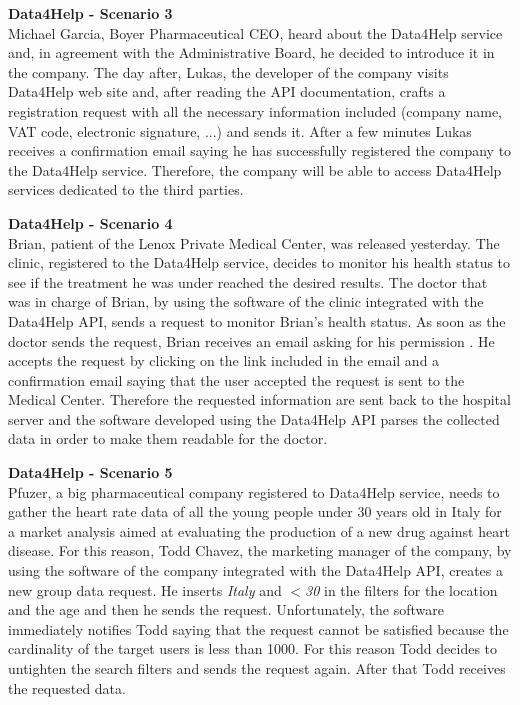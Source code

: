 \textbf{Data4Help - Scenario 3} \\
Michael Garcia, Boyer Pharmaceutical CEO, heard about the Data4Help service and, in agreement with the Administrative Board, he decided to introduce it in the company. The day after, Lukas, the developer of the company visits Data4Help web site and, after reading the API documentation, crafts a registration request with all the necessary information included (company name, VAT code, electronic signature, ...) and sends it. After a few minutes Lukas receives a confirmation email saying he has successfully registered the company to the Data4Help service. Therefore, the company will be able to access Data4Help services dedicated to the third parties.

\textbf{Data4Help - Scenario 4} \\
Brian, patient of the Lenox Private Medical Center, was released  yesterday. The clinic, registered to the Data4Help service, decides to monitor his health status to see if the treatment he was under reached the desired results.
The doctor that was in charge of Brian, by using the software of the clinic integrated with the Data4Help API, sends a request to monitor Brian's health status.
As soon as the doctor sends the request, Brian receives an email asking for his permission . He accepts the request by clicking on the link included in the email and a confirmation email saying that the user accepted the request is sent to the Medical Center. Therefore the requested information are sent back to the hospital server and the software developed using the Data4Help API parses the collected data in order to make them readable for the doctor.

\textbf{Data4Help - Scenario 5} \\
Pfuzer, a big pharmaceutical company registered to Data4Help service, needs to gather the heart rate data of all the young people under 30 years old in Italy for a market analysis aimed at evaluating the production of a new drug against heart disease. For this reason, Todd Chavez, the marketing manager of the company, by using the software of the company integrated with the Data4Help API, creates a new group data request. He inserts \textit{Italy} and \textit{$<$30} in the filters for the location and the age and then he sends the request. Unfortunately, the software immediately notifies  Todd saying that the request cannot be satisfied because the cardinality of the target users is less than 1000. For this reason Todd decides to untighten the search filters and sends the request again. After that Todd receives the requested data.

